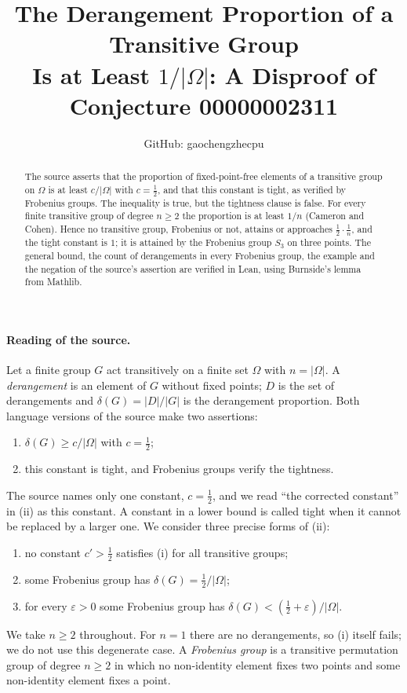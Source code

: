 \documentclass[11pt]{article}
\title{The Derangement Proportion of a Transitive Group\\Is at Least $1/|\Omega|$:
A Disproof of Conjecture 00000002311}
\author{GitHub: gaochengzhecpu}
\date{}
\theoremstyle{remark}
\begin{document}
\maketitle
\begin{abstract}
The source asserts that the proportion of fixed-point-free elements of
a transitive group on $\Omega$ is at least $c/|\Omega|$ with
$c=\tfrac12$, and that this constant is tight, as verified by Frobenius
groups. The inequality is true, but the tightness clause is false. For
every finite transitive group of degree $n\ge2$ the proportion is at
least $1/n$ (Cameron and Cohen). Hence no transitive group, Frobenius
or not, attains or approaches $\tfrac12\cdot\tfrac1n$, and the tight
constant is $1$; it is attained by the Frobenius group $S_3$ on three
points. The general bound, the count of derangements in every Frobenius
group, the example and the negation of the source's assertion are
verified in Lean, using Burnside's lemma from Mathlib.
\end{abstract}

\paragraph{Reading of the source.}
Let a finite group $G$ act transitively on a finite set $\Omega$ with
$n=|\Omega|$. A \emph{derangement} is an element of $G$ without fixed
points; $D$ is the set of derangements and $\delta(G)=|D|/|G|$ is the
derangement proportion. Both language versions of the source make two
assertions:
\begin{enumerate}
\item[(i)] $\delta(G)\ge c/|\Omega|$ with $c=\tfrac12$;
\item[(ii)] this constant is tight, and Frobenius groups verify the
 tightness.
\end{enumerate}
The source names only one constant, $c=\tfrac12$, and we read ``the
corrected constant'' in (ii) as this constant. A constant in a lower
bound is called tight when it cannot be replaced by a larger one. We
consider three precise forms of (ii):
\begin{enumerate}
\item[(T1)] no constant $c'>\tfrac12$ satisfies (i) for all transitive
 groups;
\item[(T2)] some Frobenius group has $\delta(G)=\tfrac12/|\Omega|$;
\item[(T3)] for every $\varepsilon>0$ some Frobenius group has
 $\delta(G)<(\tfrac12+\varepsilon)/|\Omega|$.
\end{enumerate}
We take $n\ge2$ throughout. For $n=1$ there are no derangements, so
(i) itself fails; we do not use this degenerate case. A
\emph{Frobenius group} is a transitive permutation group of degree
$n\ge2$ in which no non-identity element fixes two points and some
non-identity element fixes a point.
\end{document}
